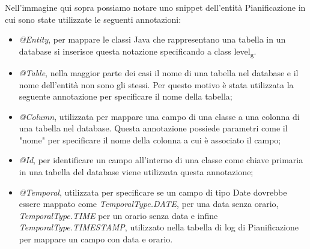 \noindent Nell'immagine qui sopra possiamo notare uno snippet dell'entità Pianificazione in cui sono state utilizzate le seguenti annotazioni:
\begin{itemize}
\item \textit{@Entity}, per mappare le classi Java che rappresentano una tabella in un database si inserisce questa notazione specificando a class level\textsubscript{g}.
\item \textit{@Table}, nella maggior parte dei casi il nome di una tabella nel database e il nome dell'entità non sono gli stessi. Per questo motivo è stata utilizzata la seguente annotazione per specificare il nome della tabella;
\item \textit{@Column}, utilizzata per mappare una campo di una classe a una colonna di una tabella nel database. Questa annotazione possiede parametri come il "nome" per specificare il nome della colonna a cui è associato il campo;
\item \textit{@Id}, per identificare un campo all'interno di una classe come chiave primaria in una tabella del database viene utilizzata questa annotazione;
\item \textit{@Temporal}, utilizzata per specificare se un campo di tipo Date dovrebbe essere mappato come \textit{TemporalType.DATE}, per una data senza orario, \textit{TemporalType.TIME} per un orario senza data e infine \textit{TemporalType.TIMESTAMP}, utilizzato nella tabella di log di Pianificazione per mappare un campo con data e orario.
\end{itemize}
